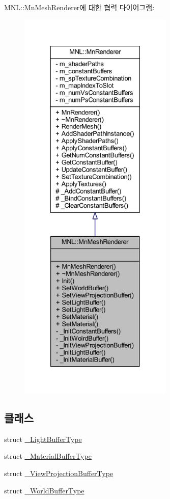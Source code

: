 M\+NL\+:\+:Mn\+Mesh\+Renderer에 대한 협력 다이어그램\+:\nopagebreak
\begin{figure}[H]
\begin{center}
\leavevmode
\includegraphics[height=550pt]{class_m_n_l_1_1_mn_mesh_renderer__coll__graph}
\end{center}
\end{figure}
\subsection*{클래스}
\begin{DoxyCompactItemize}
\item 
struct \hyperlink{struct_m_n_l_1_1_mn_mesh_renderer_1_1___light_buffer_type}{\+\_\+\+Light\+Buffer\+Type}
\item 
struct \hyperlink{struct_m_n_l_1_1_mn_mesh_renderer_1_1___material_buffer_type}{\+\_\+\+Material\+Buffer\+Type}
\item 
struct \hyperlink{struct_m_n_l_1_1_mn_mesh_renderer_1_1___view_projection_buffer_type}{\+\_\+\+View\+Projection\+Buffer\+Type}
\item 
struct \hyperlink{struct_m_n_l_1_1_mn_mesh_renderer_1_1___world_buffer_type}{\+\_\+\+World\+Buffer\+Type}
\end{DoxyCompactItemize}
